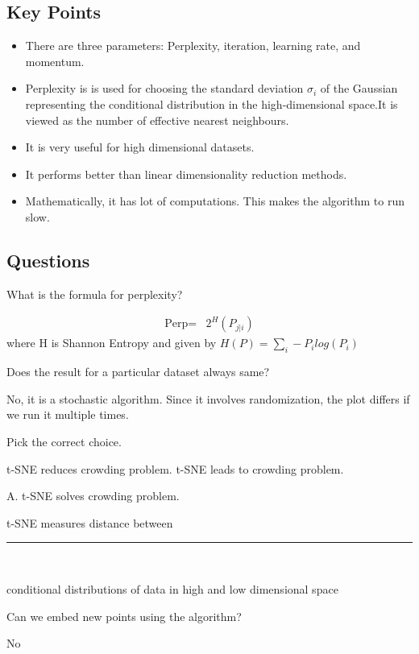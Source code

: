 \documentclass[12pt,letterpaper, onecolumn]{exam}
\begin{document}
\subsection*{Key Points}
\begin{itemize}
\item There are three parameters: Perplexity, iteration, learning rate, and momentum.
\item Perplexity is is used for choosing the standard deviation $\sigma_i$ of the Gaussian representing the conditional distribution in the high-dimensional space.It is viewed as the number of effective nearest neighbours.
\item It is very useful for high dimensional datasets.
\item It performs better than linear dimensionality reduction methods.
\item Mathematically, it has lot of computations. This makes the algorithm to run slow.
\end{itemize}

\subsection*{Questions}

\begin{questions}
\question[] What is the formula for perplexity?\\
\begin{Solution}
\begin{align*}
\text{Perp} = {}& 2^H(P_{j|i})
\end{align*}
where H is Shannon Entropy and given by $H(P) = \sum_i -P_i log(P_i)$
\end{Solution}
\question[] Does the result for a particular dataset always same?\\
\begin{Solution}
No, it is a stochastic algorithm. Since it involves randomization, the plot differs if we run it multiple times.
\end{Solution}

\question[] Pick the correct choice.
\begin{choices}
\choice t-SNE reduces crowding problem.
\choice t-SNE leads to crowding problem.
\end{choices}
\begin{Solution}
A. t-SNE solves crowding problem.
\end{Solution}


\question[] 
t-SNE measures distance between \rule{2cm}{0.15mm}\\
\begin{Solution}
conditional distributions of data in high and low dimensional space
\end{Solution}

\question[] Can we embed new points using the algorithm?

\begin{Solution}
No
\end{Solution}




\end{questions}
\end{document}
